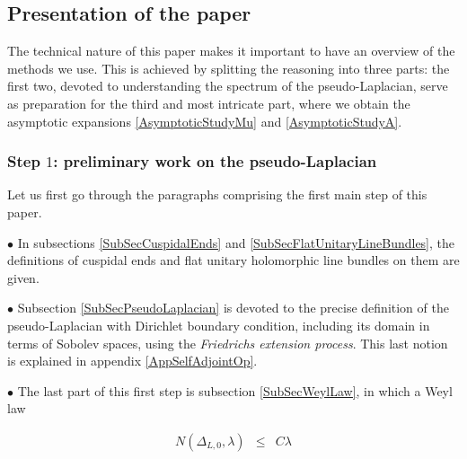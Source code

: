 \documentclass{jams-l}
\theoremstyle{definition}
\theoremstyle{remark}
\numberwithin{equation}{section}
\begin{document}
    
    \subsection{Presentation of the paper}
    
        The technical nature of this paper makes it important to have an overview of the methods we use. This is achieved by splitting the reasoning into three parts: the first two, devoted to understanding the spectrum of the pseudo-Laplacian, serve as preparation for the third and most intricate part, where we obtain the asymptotic expansions \eqref{AsymptoticStudyMu} and \eqref{AsymptoticStudyA}.
    
        \subsubsection{Step $1$: preliminary work on the pseudo-Laplacian}
        
            Let us first go through the paragraphs comprising the first main step of this paper.
            
            \medskip
            
            \hspace{10pt} $\bullet$ In subsections \ref{SubSecCuspidalEnds} and \ref{SubSecFlatUnitaryLineBundles}, the definitions of cuspidal ends and flat unitary holomorphic line bundles on them are given.
            
            \medskip
            
            \hspace{10pt} $\bullet$ Subsection \ref{SubSecPseudoLaplacian} is devoted to the precise definition of the pseudo-Laplacian with Dirichlet boundary condition, including its domain in terms of Sobolev spaces, using the \textit{Friedrichs extension process}. This last notion is explained in appendix \ref{AppSelfAdjointOp}.
            
            \medskip
            
            \hspace{10pt} $\bullet$ The last part of this first step is subsection \ref{SubSecWeylLaw}, in which a Weyl law
            
                \begin{equation}
                \label{WeylLaw}
                    \begin{array}{lll}
                        N \left( \Delta_{L,0}, \lambda \right) & \leqslant & C \lambda
                    \end{array}
                \end{equation}
                
\end{document}
